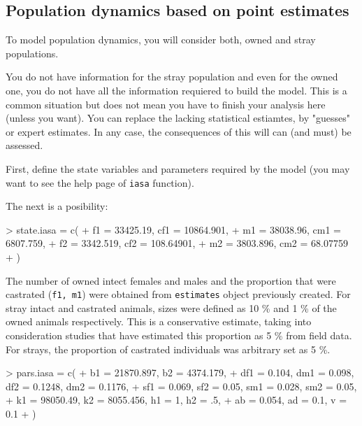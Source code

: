 \documentclass[a4paper]{article}
\begin{document}
\subsection{Population dynamics based on point estimates}
To model population dynamics, you will consider both, owned and stray populations.

You do not have information for the stray population and even for the owned one, you do not have all the information requiered to build the model. This is a common situation but does not mean you have to finish your analysis here (unless you want). You can replace the lacking statistical estiamtes, by "guesses" or expert estimates. In any case, the consequences of this will can (and must) be assessed.

First, define the state variables and parameters required by the model (you may want to see the help page of \texttt{iasa} function). 

The next is a posibility:

\begin{Schunk}
\begin{Sinput}
> state.iasa = c(
+    f1 = 33425.19, cf1 = 10864.901,
+    m1 = 38038.96, cm1 = 6807.759,
+    f2 = 3342.519, cf2 = 108.64901,
+    m2 = 3803.896, cm2 = 68.07759
+ )
\end{Sinput}
\end{Schunk}

The number of owned intect females and males and the proportion that were castrated (\texttt{f1, m1}) were obtained from \texttt{estimates} object previously created. For stray intact and castrated animals, sizes were defined as 10 \% and 1 \% of the owned animals respectively. This is a conservative estimate, taking into consideration studies that have estimated this proportion as 5 \% from field data. For strays, the proportion of castrated individuals was arbitrary set as 5 \%.

\begin{Schunk}
\begin{Sinput}
> pars.iasa = c(
+    b1 = 21870.897, b2 = 4374.179,
+    df1 = 0.104, dm1 = 0.098, df2 = 0.1248, dm2 = 0.1176,
+    sf1 = 0.069, sf2 = 0.05, sm1 = 0.028, sm2 = 0.05,
+    k1 = 98050.49, k2 = 8055.456, h1 = 1, h2 = .5,
+    ab = 0.054, ad = 0.1, v = 0.1
+ )
\end{Sinput}
\end{Schunk}
\end{document}
